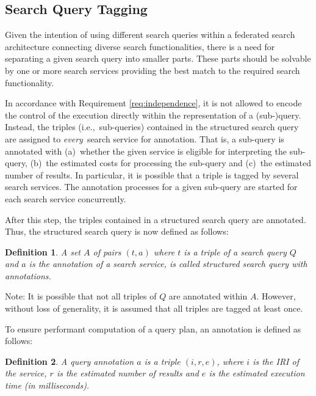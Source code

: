 \documentclass{acm_proc_article-sp}
\newtheorem{definition}{Definition}
\newcommand{\ie}{i.e.,~}
\begin{document}
\subsection{Search Query Tagging}
Given the intention of using different search queries within a federated search architecture connecting diverse search functionalities, there is a need for separating a given search query into smaller parts.
These parts should be solvable by one or more search services providing the best match to the required search functionality.

In accordance with Requirement \ref{req:independence}, it is not allowed to encode the control of the execution directly within the representation of a (sub-)query.
Instead, the triples (\ie sub-queries) contained in the structured search query are assigned to \emph{every}\ search service for annotation.
That is, a sub-query is annotated with (a)~whether the given service is eligible for interpreting the sub-query, (b)~the estimated costs for processing the sub-query and (c)~the estimated number of results. 
In particular, it is possible that a triple is tagged by several search services.
The annotation processes for a given sub-query are started for each search service concurrently.

After this step, the triples contained in a structured search query are annotated. 
Thus, the structured search query is now defined as follows:
\begin{definition}%
A set $A$ of pairs $(t,a)$ where $t$ is a triple of a search query $Q$ and $a$ is the annotation of a search service, is called structured search query with annotations. 
\end{definition} 
Note: It is possible that not all triples of $Q$ are annotated within $A$.
However, without loss of generality, it is assumed that all triples are tagged at least once.

To ensure performant computation of a query plan, an annotation is defined as follows:
\begin{definition}
A query annotation $a$ is a triple $(i,r,e)$, where $i$ is the IRI of the service, $r$ is the estimated number of results and $e$ is the estimated execution time (in milliseconds).
\end{definition}
\end{document}
